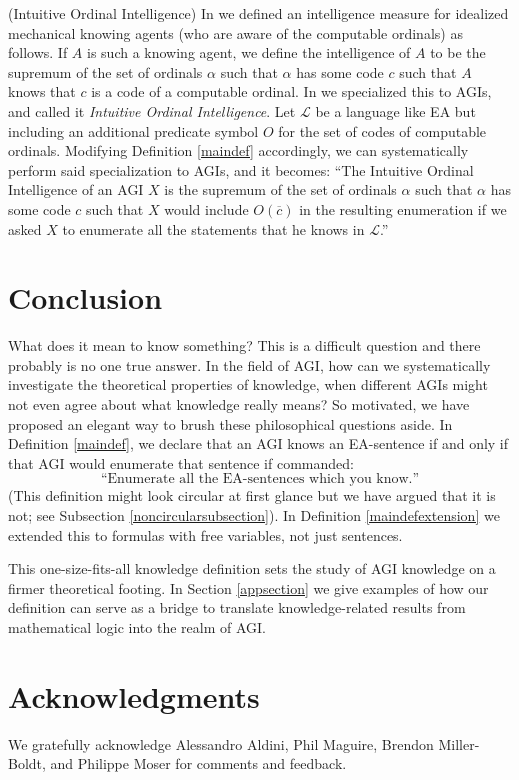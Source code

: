 \documentclass[runningheads]{llncs}
\begin{document}
\begin{example}
  (Intuitive Ordinal Intelligence) In \cite{ioi1} we defined
  an intelligence measure for idealized mechanical knowing agents (who are
  aware of the computable ordinals) as follows.
  If $A$ is such a knowing agent, we define the intelligence of $A$ to be
  the supremum of the set of ordinals $\alpha$ such that
  $\alpha$ has some code $c$ such that $A$ knows that $c$ is a code of
  a computable ordinal. In \cite{ioi2} we specialized this to AGIs, and
  called it \emph{Intuitive Ordinal Intelligence}.
  Let $\mathscr L$ be a language like EA but including an additional
  predicate symbol $O$ for the set of codes of computable ordinals.
  Modifying Definition \ref{maindef} accordingly,
  we can systematically perform said specialization to AGIs, and it becomes:
  ``The Intuitive Ordinal
  Intelligence of an AGI $X$ is the supremum of the set of ordinals $\alpha$
  such that $\alpha$ has some code $c$ such that $X$ would include $O(\overline c)$
  in the resulting enumeration if we asked $X$ to enumerate all the statements
  that he knows in $\mathscr L$.''
\end{example}

\section{Conclusion}
\label{conclusionsection}

What does it mean to know something? This is a difficult question and there probably
is no one true answer. In the field of AGI, how can we systematically investigate
the theoretical properties of knowledge, when different AGIs might not even agree
about what knowledge really means? So motivated, we have proposed
an elegant way to brush these philosophical questions aside. In Definition \ref{maindef},
we declare that an AGI knows an EA-sentence if and
only if that AGI would enumerate that sentence if commanded:
  \[
  \text{``Enumerate all the EA-sentences which you know.''}
  \]
(This definition might look circular at first glance but we have argued that it is
not; see Subsection \ref{noncircularsubsection}).
In Definition \ref{maindefextension}
we extended this to formulas with free variables, not just sentences.

This one-size-fits-all knowledge definition sets the study of AGI knowledge
on a firmer theoretical footing. In Section \ref{appsection} we give examples
of how our definition can serve as a bridge to translate knowledge-related
results from mathematical logic into the realm of AGI.

\section*{Acknowledgments}

We gratefully acknowledge Alessandro Aldini, Phil Maguire, Brendon Miller-Boldt,
and Philippe Moser for
comments and feedback.



\end{document}
